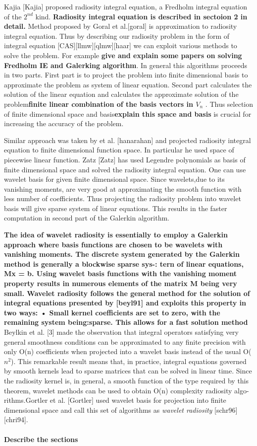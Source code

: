 \documentclass[12pt]{article}
\begin{document}
Kajia [Kajia] proposed radiosity integral equation, a Fredholm integral equation of the $2^{nd}$ kind. { \bf Radiosity integral equation is described in sectoion 2 in detail.} Method proposed by Goral et al.[goral] is approximation to radiosity integral equation. Thus by describing  our radiosity problem in the form of integral equation [CAS][llmw][qlmw][haar] we can exploit various methods to solve the problem. For example  {\bf give and explain some papers on solving Fredholm IE and Galerking algorithm}. In general this algorithms proceeds in two parts. First part is to project the problem into finite dimensional basis to approximate the problem as system of linear equation. Second part calculates the solution of the linear equation and calculates the approximate solution of the problem{\bf  finite linear combination of the basis vectors in  $V_n$ }. Thus selection of finite dimensional space and basis{\bf explain this space and basis} is crucial for increasing the accuracy of the problem.

Similar approach was taken by et al. [hanarahan] and projected radiosity integral equation to finite dimensional function space. In particular he used space of piecewise linear function. Zatz [Zatz] has used Legendre polynomials as basis of finite dimensional space and solved the radiosity integral equation. One can use wavelet basis for given finite dimensional space. Since wavelets,due to its vanishing moments, are very good at approximating the smooth function with less number of coefficients. Thus projecting the radiosity problem into wavelet basis will give sparse system of linear equations. This results in the faster computation in second part of the Galerkin algorithm. 

{\bf The idea of wavelet radiosity is essentially to employ a Galerkin approach where basis functions are chosen to be wavelets with vanishing moments. The discrete system generated by the Galerkin method is generally a blockwise sparse sys-:
tern of linear equations, Mx = b. Using wavelet basis functions with the vanishing moment
property results in numerous elements of the matrix M being very small. Wavelet radiosity
follows the general method for the solution of integral equations presented by [beyl91] and
exploits this property in two ways:
• Small kernel coefficients are set to zero, with the remaining system being:sparse. This
allows for a fast solution method} Beylkin et al. [3] made the observation that integral operators satisfying very general smoothness conditions can be approximated to any finite precision with only O(n) coefficients
when projected into a wavelet basis instead of the usual O($n^2$).
This remarkable result means that, in practice, integral equations
governed by smooth kernels lead to sparse matrices that can be
solved in linear time. Since the radiosity kernel is, in general,
a smooth function of the type required by this theorem, wavelet
methods can be used to obtain O(n) complexity radiosity algo-
rithms.Gortler et al. [Gortler] used wavelet basis for projection into finite dimensional space and call this set of algorithms as {\em wavelet radiosity} [schr96][chri94]. \\\\
{\bf Describe the sections}
\end{document}
